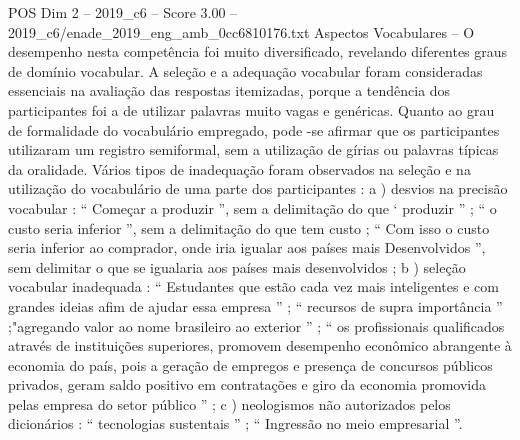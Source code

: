 \begin{textsample}{POS Dim 2 – 2019\_c6 – Score 3.00 – 2019\_c6/enade\_2019\_eng\_amb\_0cc6810176.txt}
Aspectos Vocabulares – O desempenho nesta competência foi muito diversificado, revelando diferentes graus de domínio vocabular.
A seleção e a adequação vocabular foram consideradas essenciais na avaliação das respostas itemizadas, porque a tendência dos participantes foi a de utilizar palavras muito vagas e genéricas.
Quanto ao grau de formalidade do vocabulário empregado, pode -se afirmar que os participantes utilizaram um registro semiformal, sem a utilização de gírias ou palavras típicas da oralidade.
Vários tipos de inadequação foram observados na seleção e na utilização do vocabulário de uma parte dos participantes : a ) desvios na precisão vocabular : “ Começar a produzir ”, sem a delimitação do que ‘ produzir ” ; “ o custo seria inferior ”, sem a delimitação do que tem custo ; “ Com isso o custo seria inferior ao comprador, onde iria igualar aos países mais Desenvolvidos ”, sem delimitar o que se igualaria aos países mais desenvolvidos ; b ) seleção vocabular inadequada : “ Estudantes que estão cada vez mais inteligentes e com grandes ideias afim de ajudar essa empresa ” ; “ recursos de supra importância ” ;"agregando valor ao nome brasileiro ao exterior ” ; “ os profissionais qualificados através de instituições superiores, promovem desempenho econômico abrangente à economia do país, pois a geração de empregos e presença de concursos públicos privados, geram saldo positivo em contratações e giro da economia promovida pelas empresa do setor público ” ; c ) neologismos não autorizados pelos dicionários : “ tecnologias sustentais ” ; “ Ingressão no meio empresarial ”.

\end{textsample}
